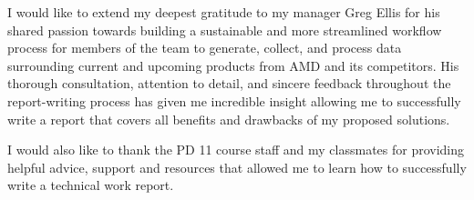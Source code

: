 \documentclass[12pt]{article}
\begin{document}



\indent\hspace{0.5in} I would like to extend my deepest gratitude to my manager Greg Ellis for his shared passion towards building a sustainable and more streamlined workflow process for members of the team to generate, collect, and process data surrounding current and upcoming products from AMD and its competitors. His thorough consultation, attention to detail, and sincere feedback throughout the report-writing process has given me incredible insight allowing me to successfully write a report that covers all benefits and drawbacks of my proposed solutions.

\indent\hspace{0.5in} I would also like to thank the PD 11 course staff and my classmates for providing helpful advice, support and resources that allowed me to learn how to successfully write a technical work report.
\end{document}
